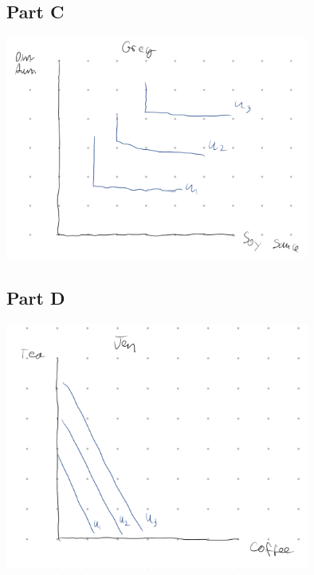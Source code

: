 \documentclass[8pt]{extarticle}
\begin{document}
{\subsection*{Part C}
\begin{center}
	\includegraphics[width=10cm]{HW2Q12C}
\end{center}
\subsection*{Part D}
\begin{center}
	\includegraphics[width=10cm]{HW2Q12D}
\end{center}
}
\end{document}
